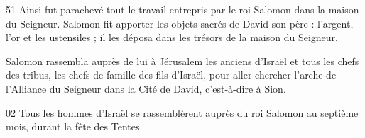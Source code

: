 51 Ainsi fut parachevé tout le travail entrepris par le roi Salomon dans la maison du Seigneur. Salomon fit apporter les objets sacrés de David son père : l’argent, l’or et les ustensiles ; il les déposa dans les trésors de la maison du Seigneur.

Salomon rassembla auprès de lui à Jérusalem les anciens d’Israël et tous les chefs des tribus, les chefs de famille des fils d’Israël, pour aller chercher l’arche de l’Alliance du Seigneur dans la Cité de David, c’est-à-dire à Sion.

02 Tous les hommes d’Israël se rassemblèrent auprès du roi Salomon au septième mois, durant la fête des Tentes.